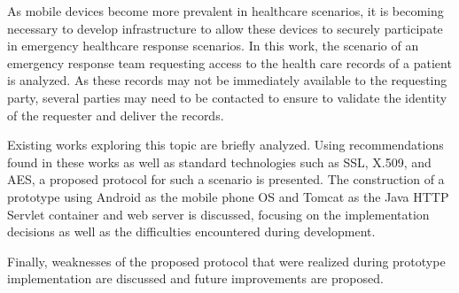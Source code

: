 As mobile devices become more prevalent in healthcare scenarios, it is becoming necessary to develop infrastructure to allow these devices to securely participate in emergency healthcare response scenarios. In this work, the scenario of an emergency response team requesting access to the health care records of a patient is analyzed. As these records may not be immediately available to the requesting party, several parties may need to be contacted to ensure to validate the identity of the requester and deliver the records.

Existing works exploring this topic are briefly analyzed. Using recommendations found in these works as well as standard technologies such as SSL, X.509, and AES, a proposed protocol for such a scenario is presented. The construction of a prototype using Android as the mobile phone OS and Tomcat as the Java HTTP Servlet container and web server is discussed, focusing on the implementation decisions as well as the difficulties encountered during development.

Finally, weaknesses of the proposed protocol that were realized during prototype implementation are discussed and future improvements are proposed. 